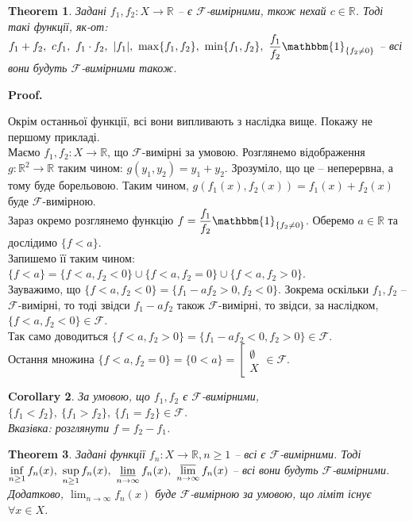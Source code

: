 \documentclass[a4paper, 10pt]{article}
\makeatletter
\theoremstyle{theoremdd}
\newtheorem{theorem}{Theorem}[subsection]
\newtheorem{corollary}[theorem]{Corollary}
\renewenvironment{proof}[1][Proof.\\]{\par
\pushQED{\hfill \qed}%
\normalfont \topsep6\p@\@plus6\p@\relax
\trivlist
\item\relax
{\bfseries
#1\@addpunct{.}}\hspace\labelsep\ignorespaces
}{%
\popQED\endtrivlist\@endpefalse
}
\makeatother
\begin{document}
\begin{theorem}
Задані $f_1,f_2 \colon X \to \mathbb{R}$ -- є $\mathcal{F}$-вимірними, ткож нехай $c \in \mathbb{R}$. Тоді такі функції, як-от: $f_1+f_2,\ cf_1,\ f_1 \cdot f_2,\ |f_1|,\ \max\{f_1,f_2\},\ \min\{f_1,f_2\},\ \dfrac{f_1}{f_2} \mathbbm{1}_{\{f_2 \neq 0\}}$ -- всі вони будуть $\mathcal{F}$-вимірними також.
\end{theorem}

\begin{proof}
Окрім останньої функції, всі вони випливають з наслідка вище. Покажу не першому прикладі.\\
Маємо $f_1,f_2 \colon X \to \mathbb{R}$, що $\mathcal{F}$-вимірні за умовою. Розглянемо відображення $g \colon \mathbb{R}^2 \to \mathbb{R}$ таким чином: $g(y_1,y_2) = y_1+y_2$. Зрозуміло, що це -- неперервна, а тому буде борельовою. Таким чином, $g(f_1(x),f_2(x)) = f_1(x) + f_2(x)$ буде $\mathcal{F}$-вимірною.
\bigskip \\
Зараз окремо розглянемо функцію $f = \dfrac{f_1}{f_2} \mathbbm{1}_{\{f_2 \neq 0\}}$. Оберемо $a \in \mathbb{R}$ та дослідимо $\{f < a\}$.\\
Запишемо її таким чином: $\{f < a\} = \{f < a, f_2 < 0\} \cup \{f < a, f_2 = 0\} \cup \{f < a, f_2 > 0\}$.\\
Зауважимо, що $\{f < a, f_2 < 0\} = \{ f_1-af_2 > 0, f_2 < 0\}$. Зокрема оскільки $f_1,f_2$ -- $\mathcal{F}$-вимірні, то тоді звідси $f_1-af_2$ також $\mathcal{F}$-вимірні, то звідси, за наслідком, $\{f < a, f_2 < 0\} \in \mathcal{F}$.\\
Так само доводиться $\{f < a, f_2 > 0\} = \{f_1-af_2 < 0, f_2 > 0\} \in \mathcal{F}$.\\
Остання множина $\{f < a, f_2 = 0\} = \{ 0 < a\} = \left[ \begin{gathered}\emptyset \\ X \end{gathered} \right. \in \mathcal{F}$.
\end{proof}

\begin{corollary}
За умовою, що $f_1,f_2$ є $\mathcal{F}$-вимірними, $\{f_1 < f_2\},\ \{f_1 > f_2\},\ \{f_1 = f_2\} \in \mathcal{F}$.\\
\textit{Вказівка: розглянути $f = f_2 - f_1$.}
\end{corollary}

\begin{theorem}
Задані функції $f_n \colon X \to \mathbb{R}, n \geq 1$ -- всі є $\mathcal{F}$-вимірними. Тоді \\ $\displaystyle\inf_{n \geq 1} f_n(x),\ \sup_{n \geq 1} f_n(x),\ \varliminf_{n \to \infty} f_n(x),\ \varlimsup_{n \to \infty} f_n(x)$ -- всі вони будуть $\mathcal{F}$-вимірними. Додатково, $\displaystyle\lim_{n \to \infty} f_n(x)$ буде $\mathcal{F}$-вимірною за умовою, що ліміт існує $\forall x \in X$.
\end{theorem}
\end{document}
